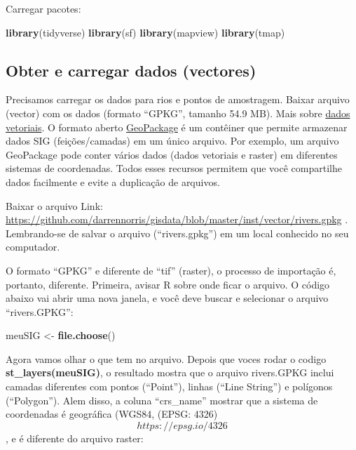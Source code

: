 \documentclass[
]{article}
\newenvironment{Shaded}{\begin{snugshade}}{\end{snugshade}}
\newcommand{\FunctionTok}[1]{\textcolor[rgb]{0.13,0.29,0.53}{\textbf{#1}}}
\newcommand{\NormalTok}[1]{#1}
\newcommand{\OtherTok}[1]{\textcolor[rgb]{0.56,0.35,0.01}{#1}}
\begin{document}
Carregar pacotes:

\begin{Shaded}
\begin{Highlighting}[]
\FunctionTok{library}\NormalTok{(tidyverse)}
\FunctionTok{library}\NormalTok{(sf)}
\FunctionTok{library}\NormalTok{(mapview)}
\FunctionTok{library}\NormalTok{(tmap)}
\end{Highlighting}
\end{Shaded}

\hypertarget{obter-e-carregar-dados-vectores-1}{%
\subsection{Obter e carregar dados (vectores)}\label{obter-e-carregar-dados-vectores-1}}

Precisamos carregar os dados para rios e pontos de amostragem. Baixar arquivo (vector) com os dados (formato ``GPKG'', tamanho 54.9 MB). Mais sobre \href{https://docs.qgis.org/3.22/pt_BR/docs/gentle_gis_introduction/vector_data.html}{dados vetoriais}. O formato aberto \href{https://www.geopackage.org/}{GeoPackage} é um contêiner que permite armazenar dados SIG (feições/camadas) em um único arquivo. Por exemplo, um arquivo GeoPackage pode conter vários dados (dados vetoriais e raster) em diferentes sistemas de coordenadas. Todos esses recursos permitem que você compartilhe dados facilmente e evite a duplicação de arquivos.

Baixar o arquivo Link: \url{https://github.com/darrennorris/gisdata/blob/master/inst/vector/rivers.gpkg} . Lembrando-se de salvar o arquivo (``rivers.gpkg'') em um local conhecido no seu computador.

O formato ``GPKG'' e diferente de ``tif'' (raster), o processo de importação é, portanto, diferente. Primeira, avisar R sobre onde ficar o arquivo. O código abaixo vai abrir uma nova janela, e você deve buscar e selecionar o arquivo ``rivers.GPKG'':

\begin{Shaded}
\begin{Highlighting}[]
\NormalTok{meuSIG }\OtherTok{\textless{}{-}} \FunctionTok{file.choose}\NormalTok{()}
\end{Highlighting}
\end{Shaded}

Agora vamos olhar o que tem no arquivo. Depois que voces rodar o codigo \colorbox[HTML]{d3d3d3}{\textbf{st\_layers(meuSIG)}}, o resultado mostra que o arquivo rivers.GPKG inclui camadas diferentes com pontos (``Point''), linhas (``Line String'') e polígonos (``Polygon''). Alem disso, a coluna ``crs\_name'' mostrar que a sistema de coordenadas é geográfica (WGS84, (EPSG: 4326)\[https://epsg.io/4326\], e é diferente do arquivo raster:
\end{document}
